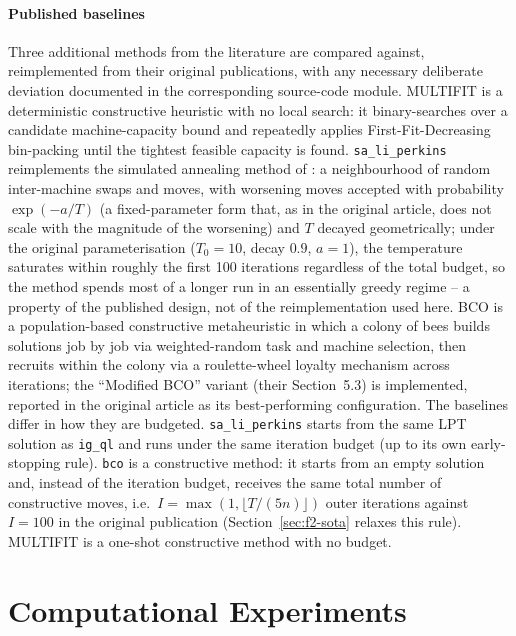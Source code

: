 \documentclass[final,3p,times,11pt,authoryear]{elsarticle}
\begin{document}
\paragraph{Published baselines}
Three additional methods from the literature are compared against,
reimplemented from their original publications, with any necessary
deliberate deviation documented in the corresponding source-code
module.
MULTIFIT \citep{CoffmanGareyJohnson1978} is a deterministic constructive
heuristic with no local search: it binary-searches over a candidate
machine-capacity bound and repeatedly applies First-Fit-Decreasing
bin-packing until the tightest feasible capacity is found.
\texttt{sa\_li\_perkins} reimplements the simulated annealing method of
\citet{LiPerkins2024}: a neighbourhood of random inter-machine swaps and
moves, with worsening moves accepted with probability $\exp(-a/T)$ (a
fixed-parameter form that, as in the original article, does not scale
with the magnitude of the worsening) and $T$ decayed geometrically;
under the original parameterisation ($T_0=10$, decay $0.9$, $a=1$), the
temperature saturates within roughly the first 100 iterations
regardless of the total budget, so the method spends most of a longer
run in an essentially greedy regime -- a property of the published
design, not of the reimplementation used here.
BCO \citep{DavidovicEtal2012} is a population-based constructive
metaheuristic in which a colony of bees builds solutions job by job via
weighted-random task and machine selection, then recruits within the
colony via a roulette-wheel loyalty mechanism across iterations; the
``Modified BCO'' variant (their Section~5.3) is implemented, reported in
the original article as its best-performing configuration.
The baselines differ in how they are budgeted.
\texttt{sa\_li\_perkins} starts from the same LPT solution as
\texttt{ig\_ql} and runs under the same iteration budget (up to its own
early-stopping rule). \texttt{bco} is a constructive method: it starts
from an empty solution and, instead of the iteration budget, receives
the same total number of constructive moves, i.e.\
$I = \max(1,\lfloor T/(5n)\rfloor)$ outer iterations against $I=100$ in
the original publication (Section~\ref{sec:f2-sota} relaxes this rule).
MULTIFIT is a one-shot constructive method with no budget.


\section{Computational Experiments}
\label{sec:experiments}
\end{document}
